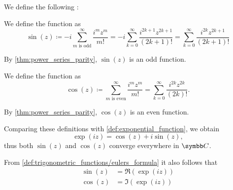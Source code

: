 \begin{definition}\label{def:trigonometric_functions}
  We define the following :

  \begin{defenum}
     We define the  function as
    \begin{equation*}
      \sin(z)
      \coloneqq
      -i \sum_{m \text{ is odd}}^\infty \frac {i^m z^m} {m!}
      =
      -i \sum_{k=0}^\infty \frac {i^{2k+1} z^{2k+1}} {(2k + 1)!}
      =
      \sum_{k=0}^\infty \frac {i^{2k} z^{2k+1}} {(2k + 1)!}
    \end{equation*}

    By \cref{thm:power_series_parity}, \( \sin(z) \) is an odd function.

     We define the  function as
    \begin{equation*}
      \cos(z)
      \coloneqq
      \sum_{m \text{ is even}}^\infty \frac {i^m z^m} {m!}
      =
      \sum_{k=0}^\infty \frac {i^{2k} z^{2k}} {(2k)!}.
    \end{equation*}

    By \cref{thm:power_series_parity}, \( \cos(z) \) is an even function.
  \end{defenum}

  Comparing these definitions with \cref{def:exponential_function}, we obtain 
  \begin{equation}\label{def:trigonometric_functions/eulers_formula}
    \exp(iz) = \cos(z) + i \sin(z),
  \end{equation}
  thus both \( \sin(z) \) and \( \cos(z) \) converge everywhere in \( \BC \).

  From \cref{def:trigonometric_functions/eulers_formula} it also follows that
  \begin{align*}
    \sin(z) &= \Re(\exp(iz)) \\
    \cos(z) &= \Im(\exp(iz))
  \end{align*}
\end{definition}

